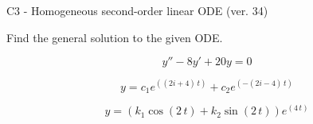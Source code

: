 \begin{exercise}
  \begin{exerciseTitle}C3 - Homogeneous second-order linear ODE (ver. 34)\end{exerciseTitle}
  \begin{exerciseStatement}
    
Find the general solution to the given ODE.

    
\[y''-8y'+20y = 0\]

  \end{exerciseStatement}
  \begin{exerciseAnswer}
    
\[y= c_{1} e^{\left(\left(2 i + 4\right) \, t\right)} + c_{2} e^{\left(-\left(2 i - 4\right) \, t\right)}\]

    
\[y= {\left(k_{1} \cos\left(2 \, t\right) + k_{2} \sin\left(2 \, t\right)\right)} e^{\left(4 \, t\right)}\]

  \end{exerciseAnswer}
\end{exercise}